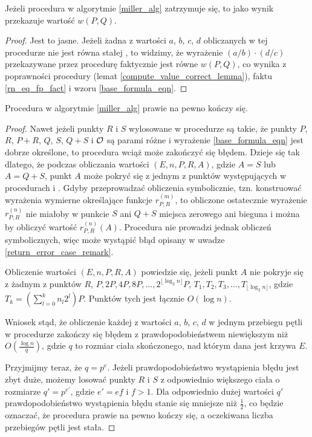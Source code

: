 \begin{theorem}
Jeżeli procedura  w algorytmie \ref{miller_alg}
zatrzymuje się,
to jako wynik przekazuje wartość $w(P, Q)$.
\end{theorem}

\begin{proof}
Jest to jasne. Jeżeli żadna z wartości $a$, $b$, $c$, $d$
obliczanych w tej procedurze nie jest równa stałej ,
to widzimy, że wyrażenie $(a/b)\cdot(d/c)$ przekazywane przez procedurę
faktycznie jest równe $w(P, Q)$,
co wynika z poprawności procedury 
(lemat \ref{compute_value_correct_lemma}),
faktu \ref{rn_eq_fp_fact}
i wzoru \ref{base_formula_eqn}.
\end{proof}

\begin{theorem}
Procedura  w algorytmie \ref{miller_alg}
prawie na pewno kończy się.
\end{theorem}

\begin{proof}
Nawet jeżeli punkty $R$ i $S$ wylosowane w procedurze 
są takie, że punkty $P$, $R$, $P+R$, $Q$, $S$, $Q+S$ i $\mathcal{O}$
są parami różne
i wyrażenie \ref{base_formula_eqn} jest dobrze określone,
to procedura  wciąż może zakończyć się błędem.
Dzieje się tak dlatego,
że podczas obliczania wartości $(E, n, P, R, A)$,
gdzie $A = S$ lub $A = Q+S$,
punkt $A$ może pokryć się z jednym z punktów
występujących w procedurach
 i .
Gdyby przeprowadzać obliczenia symbolicznie,
tzn. konstruować wyrażenia wymierne określające funkcje $r_{P,R}^{(m)}$,
to obliczone ostatecznie wyrażenie $r_{P,R}^{(n)}$
nie miałoby w punkcie $S$ ani $Q+S$ miejsca zerowego ani bieguna
i można by obliczyć wartość $r_{P,R}^{(n)}(A)$.
Procedura  nie prowadzi jednak obliczeń symbolicznych,
więc może wystąpić błąd opisany w uwadze \ref{return_error_case_remark}.

\noindent
Obliczenie wartości $(E, n, P, R, A)$ powiedzie się,
jeżeli punkt $A$ nie pokryje się z żadnym z punktów
$R$, $P, 2P, 4P, 8P, \ldots, 2^{\lfloor\log_2 n\rfloor}P$,
$T_1, T_2, T_3, \ldots, T_{\lfloor\log_2 n\rfloor}$,
gdzie $T_k = \left(\sum_{l=0}^k n_l2^l\right)P$.
Punktów tych jest łącznie $O(\log n)$.

\noindent
Wniosek stąd, że obliczenie każdej z wartości $a$, $b$, $c$, $d$
w jednym przebiegu pętli  w procedurze 
zakończy się błędem
z prawdopodobieństwem niewiększym niż $O(\frac{\log n}{q})$,
gdzie $q$ to rozmiar ciała skończonego, nad którym dana jest krzywa $E$.

\noindent
Przyjmijmy teraz, że $q = p^e$.
Jeżeli prawdopodobieństwo wystąpienia błędu jest zbyt duże,
możemy losować punkty $R$ i $S$ z odpowiednio większego ciała
o rozmiarze $q' = p^{e'}$, gdzie $e' = ef$ i $f > 1$.
Dla odpowiednio dużej wartości $q'$
prawdopodobieństwo wystąpienia błędu
stanie się mniejsze niż $\frac{1}{2}$,
co będzie oznaczać,
że procedura  prawie na pewno kończy się,
a oczekiwana liczba przebiegów pętli  jest stała.
\end{proof}

